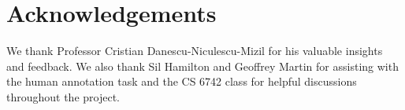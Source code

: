 \section*{Acknowledgements}
We thank Professor Cristian Danescu-Niculescu-Mizil for his valuable insights 
and feedback. We also thank Sil Hamilton and Geoffrey Martin for 
assisting with the human annotation task and the CS 6742 
class for helpful discussions throughout the project.

